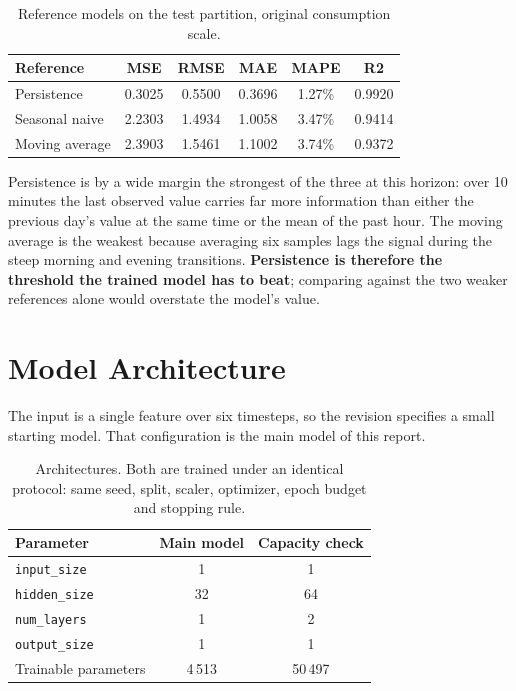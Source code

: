 \documentclass[11pt,a4paper]{article}
\begin{document}
\begin{table}[H]
\centering
\begin{tabular}{lccccc}
\toprule
\textbf{Reference} & \textbf{MSE} & \textbf{RMSE} & \textbf{MAE} & \textbf{MAPE} & \textbf{R2} \\
\midrule
Persistence    & 0.3025 & 0.5500 & 0.3696 & 1.27\% & 0.9920 \\
Seasonal naive & 2.2303 & 1.4934 & 1.0058 & 3.47\% & 0.9414 \\
Moving average & 2.3903 & 1.5461 & 1.1002 & 3.74\% & 0.9372 \\
\bottomrule
\end{tabular}
\caption{Reference models on the test partition, original consumption scale.}
\end{table}

\noindent
Persistence is by a wide margin the strongest of the three at this horizon: over 10 minutes the
last observed value carries far more information than either the previous day's value at the same
time or the mean of the past hour. The moving average is the weakest because averaging six samples
lags the signal during the steep morning and evening transitions. \textbf{Persistence is therefore
the threshold the trained model has to beat}; comparing against the two weaker references alone
would overstate the model's value.


\section{Model Architecture}
\label{sec:architecture}

The input is a single feature over six timesteps, so the revision specifies a small starting
model. That configuration is the main model of this report.

\begin{table}[H]
\centering
\begin{tabular}{lcc}
\toprule
\textbf{Parameter} & \textbf{Main model} & \textbf{Capacity check} \\
\midrule
\texttt{input\_size}   & 1 & 1 \\
\texttt{hidden\_size}  & 32 & 64 \\
\texttt{num\_layers}   & 1 & 2 \\
\texttt{output\_size}  & 1 & 1 \\
Trainable parameters   & 4\,513 & 50\,497 \\
\bottomrule
\end{tabular}
\caption{Architectures. Both are trained under an identical protocol: same seed, split, scaler,
optimizer, epoch budget and stopping rule.}
\end{table}
\end{document}
